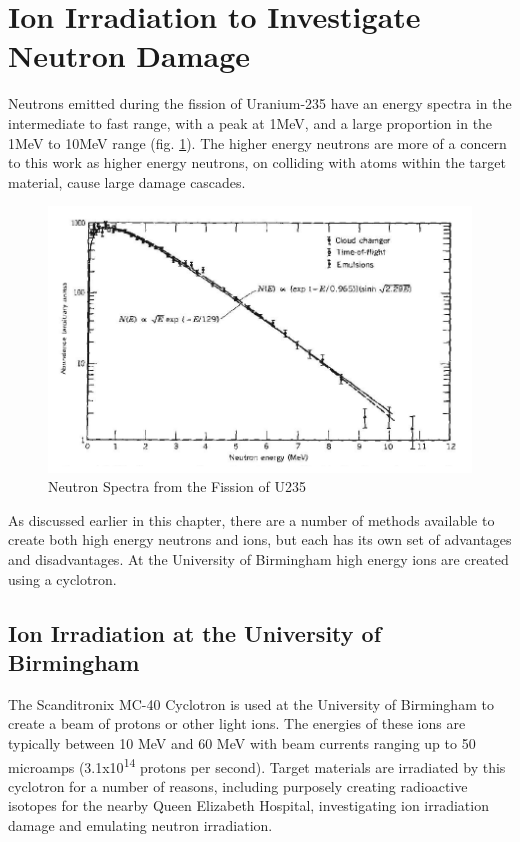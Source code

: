 \FloatBarrier
\section[Emulating Neutron Damage]{Ion Irradiation to Investigate Neutron Damage}

Neutrons emitted during the fission of Uranium-235 have an energy spectra in the intermediate to fast range, with a peak at 1MeV, and a large proportion in the 1MeV to 10MeV range (fig. \ref{fig:u235neutronspectra}).  The higher energy neutrons are more of a concern to this work as higher energy neutrons, on colliding with atoms within the target material, cause large damage cascades.  

\begin{figure}[tbp]
  \begin{center}
    \includegraphics[width=.7\linewidth]{chapters/background_activity/plots/neutronspectrau235fission.png}
    \caption{Neutron Spectra from the Fission of U235\cite{leachmanneutrons}}
    \label{fig:u235neutronspectra}
  \end{center}
\end{figure}

As discussed earlier in this chapter, there are a number of methods available to create both high energy neutrons and ions, but each has its own set of advantages and disadvantages.  At the University of Birmingham high energy ions are created using a cyclotron.

\FloatBarrier

\subsection{Ion Irradiation at the University of Birmingham}

The Scanditronix MC-40 Cyclotron is used at the University of Birmingham to create a beam of protons or other light ions.  The energies of these ions are typically between 10 MeV and 60 MeV with beam currents ranging up to 50 microamps (3.1x10\textsuperscript{14} protons per second).  Target materials are irradiated by this cyclotron for a number of reasons, including purposely creating radioactive isotopes for the nearby Queen Elizabeth Hospital, investigating ion irradiation damage and emulating neutron irradiation.

